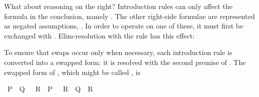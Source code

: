 \begin{isabellebody}
\begin{isamarkuptext}
  What about reasoning on the right?  Introduction rules can only
  affect the formula in the conclusion, namely .  The
  other right-side formulae are represented as negated assumptions,
  .  In order to operate on one of these, it
  must first be exchanged with .  Elim-resolution with the
   rule has this effect: 

  To ensure that swaps occur only when necessary, each introduction
  rule is converted into a swapped form: it is resolved with the
  second premise of .  The swapped form of , which might be called , is
  \begin{isabelle}%
{}{}\ {}P\ {}\ Q{}\ {}\ {}{}\ R\ {}\ P{}\ {}\ {}{}\ R\ {}\ Q{}\ {}\ R{}%
\end{isabelle}


\end{isamarkuptext}
\end{isabellebody}
